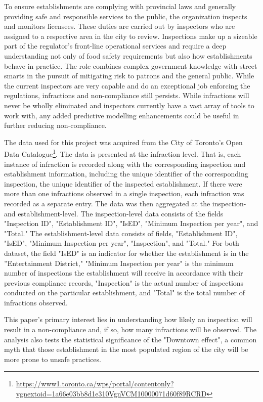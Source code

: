\documentclass[twoside,onecolumn]{article}
\begin{document}
To ensure establishments are complying with provincial laws and generally providing safe and responsible services to the public, the organization inspects and monitors licensees. These duties are carried out by inspectors who are assigned to a respective area in the city to review. Inspections make up a sizeable part of the regulator's front-line operational services and require a deep understanding not only of food safety requirements but also how establishments behave in practice. The role combines complex government knowledge with street smarts in the pursuit of mitigating risk to patrons and the general public. While the current inspectors are very capable and do an exceptional job enforcing the regulations, infractions and non-compliance still persists. While infractions will never be wholly eliminated and inspectors currently have a vast array of tools to work with, any added predictive modelling enhancements could be useful in further reducing non-compliance.

The data used for this project was acquired from the City of Toronto's Open Data Catalogue\footnote{\url{https://www1.toronto.ca/wps/portal/contentonly?vgnextoid=1a66e03bb8d1e310VgnVCM10000071d60f89RCRD}}. The data is presented at the infraction level. That is, each instance of infraction is recorded along with the corresponding inspection and establishment information, including the unique identifier of the corresponding inspection, the unique identifier of the inspected establishment. If there were more than one infractions observed in a single inspection, each infraction was recorded as a separate entry. The data was then aggregated at the inspection- and establishment-level. The inspection-level data consists of the fields "Inspection ID", "Establishment ID", "IsED", "Minimum Inspection per year", and "Total." The establishment-level data consists of fields, "Establishment ID", "IsED", "Minimum Inspection per year", "Inspection", and "Total." For both dataset, the field "IsED" is an indicator for whether the establishment is in the ''Entertainment District," "Minimum Inspection per year" is the minimum number of inspections the establishment will receive in accordance with their previous compliance records, "Inspection" is the actual number of inspections conducted on the particular establishment, and "Total" is the total number of infractions observed.

This paper's primary interest lies in understanding how likely an inspection will result in a non-compliance and, if so, how many infractions will be observed. The analysis also tests the statistical significance of the "Downtown effect", a common myth that those establishment in the most populated region of the city will be more prone to unsafe practices.
\end{document}

